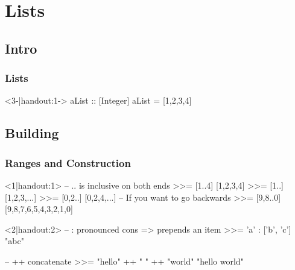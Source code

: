 \section{Lists}
\subsection{Intro}
\begin{frame}[t,fragile]
    \frametitle{Lists}
    \begin{overprint}
        \begin{hscode}<3-|handout:1->
            aList :: [Integer]
            aList = [1,2,3,4]
        \end{hscode}
    \end{overprint}
\end{frame}

\subsection{Building}
\begin{frame}[t,fragile]
    \frametitle{Ranges and Construction}
    \begin{overprint}
        \begin{hscode}<1|handout:1>
            -- .. is inclusive on both ends
            >>= [1..4]
            [1,2,3,4]
            >>= [1..]
            [1,2,3,...]
            >>= [0,2..]
            [0,2,4,...]
            -- If you want to go backwards
            >>= [9,8..0]
            [9,8,7,6,5,4,3,2,1,0]
        \end{hscode}

        \begin{hscode}<2|handout:2>
            -- : pronounced cons => prepends an item
            >>= 'a' : ['b', 'c']
            "abc"

            -- ++ concatenate
            >>= "hello" ++ " " ++ "world"
            "hello world"
        \end{hscode}
    \end{overprint}
\end{frame}

